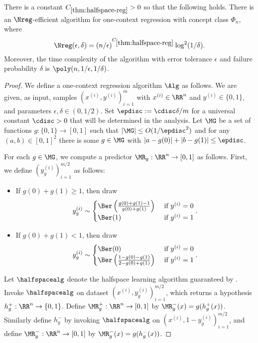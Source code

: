 \begin{theorem}\label{thm:halfspace-reg}
There is a constant $C_{\ref{thm:halfspace-reg}}>0$ so that the following holds. There is an $\Nreg$-efficient algorithm for one-context regression with concept class $\Phi_n$, where
\[\Nreg(\epsilon,\delta) = (n/\epsilon)^{C_{\ref{thm:halfspace-reg}}} \log^2(1/\delta).\]
Moreover, the time complexity of the algorithm with error tolerance $\epsilon$ and failure probability $\delta$ is $\poly(n,1/\epsilon,1/\delta)$.
\end{theorem}

\begin{proof}
We define a one-context regression algorithm $\Alg$ as follows. We are given, as input, samples $(x^{(i)},y^{(i)})_{i=1}^m$ with $x^{(i)} \in \RR^n$ and $y^{(i)} \in \{0,1\}$, and parameters $\epsilon,\delta\in(0,1/2)$. Set $\epdisc := \cdisc \delta/m$ for a universal constant $\cdisc>0$ that will be determined in the analysis. Let $\MG$ be a set of functions $g:\{0,1\} \to [0,1]$ such that $|\MG| \leq O(1/\epdisc^2)$ and for any $(a,b) \in [0,1]^2$ there is some $g \in \MG$ with $|a-g(0)|+|b-g(1)| \leq \epdisc$.

For each $g \in \MG$, we compute a predictor $\MR_g: \RR^n \to [0,1]$ as follows. First, we define $(y_g^{(i)})_{i=1}^{m/2}$ as follows:
\begin{itemize}
    \item If $g(0)+g(1) \geq 1$, then draw
    \[y_g^{(i)} \sim \begin{cases} \Ber\left(\frac{g(0)+g(1)-1}{g(0)+g(1)}\right) & \text{ if } y^{(i)} = 0 \\ 
    \Ber(1) & \text{ if } y^{(i)} = 1 
    \end{cases}.\]
    \item If $g(0) + g(1) < 1$, then draw 
    \[y_g^{(i)} \sim \begin{cases} 
    \Ber(0) & \text{ if } y^{(i)} = 0 \\ 
    \Ber\left(\frac{1-g(0)-g(1)}{2 - g(0)+g(1)}\right) & \text{ if } y^{(i)} = 1 
    \end{cases}.\]
\end{itemize}
Let $\halfspacealg$ denote the halfspace learning algorithm guaranteed by \cite[Theorem 1.8]{diakonikolas2023strongly}. Invoke $\halfspacealg$ on dataset $(x^{(i)}, y_g^{(i)})_{i=1}^{m/2}$, which returns a hypothesis $h_g^+: \RR^n \to \{0,1\}$. Define $\MR_g^+: \RR^n \to [0,1]$ by $\MR_g^-(x) = g(h_g^+(x))$. Similarly define $h_g^-$ by invoking $\halfspacealg$ on $(x^{(i)}, 1-y_g^{(i)})_{i=1}^{m/2}$, and define $\MR_g^-: \RR^n \to [0,1]$ by $\MR_g^-(x) = g(h_g^-(x))$.


\end{proof}
